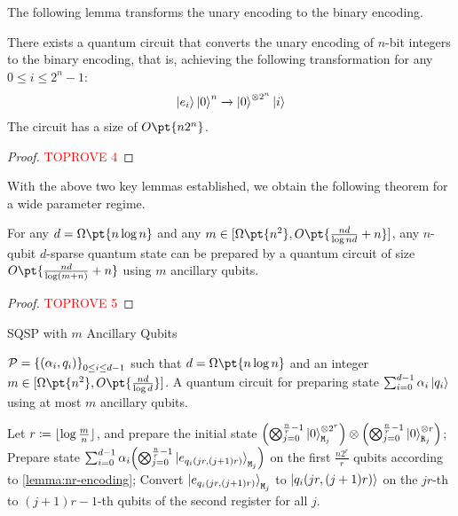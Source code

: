 \documentclass[a4paper,UKenglish,cleveref, autoref, thm-restate]{lipics-v2021}
\DeclarePairedDelimiter\rbra{\lparen}{\rparen}
\DeclarePairedDelimiter\sbra{\lbrack}{\rbrack}
\DeclarePairedDelimiter\cbra{\{}{\}}
\DeclarePairedDelimiter\floor{\lfloor}{\rfloor}
\newcommand{\bo}{O\pt}
\newcommand{\om}{\Omega\pt}
\begin{document}
The following lemma transforms the unary encoding to the binary encoding. 

\begin{lemma}\label{lemma:unary2binary}
    There exists a quantum circuit that converts the unary encoding of $n$-bit integers to the binary encoding, that is, achieving the following transformation for any $0 \leq i \leq 2^n-1$:
    \begin{align}
        \ket{e_i}\ket{0}^n \xrightarrow{} \ket{0}^{\otimes 2^n} \ket{i}
    \end{align}
    The circuit has a size of $\bo{n2^n}$.
\end{lemma}
\begin{proof}\textcolor{red}{TOPROVE 4}\end{proof}

With the above two key lemmas established, we obtain the following theorem for a wide parameter regime.

\begin{theorem}\label{thm:withanc}
   For any $d = \om{n\log n}$ and any $m \in \sbra{\om{n^2}, \bo{\frac{nd}{\log nd} + n}}$, any $n$-qubit $d$-sparse quantum state can be prepared by a quantum circuit of size $\bo{\frac{nd}{\log (m+n)} + n}$ using $m$ ancillary qubits.
\end{theorem}

\begin{proof}\textcolor{red}{TOPROVE 5}\end{proof}

\begin{algorithm}[htbp]
    \caption{SQSP with $m$ Ancillary Qubits}\label{alg:withanc} 
    \begin{algorithmic}[1]
    \REQUIRE $ \mathcal{P} = \cbra*{\rbra*{\alpha_i, q_i}}_{0\leq i \leq d-1}$ such that $d = \om{n\log n}$  and an integer $m \in \sbra{\om{n^2}, \bo{\frac{nd}{\log d}}}$.
    \ENSURE A quantum circuit for preparing state $\sum_{i=0}^{d-1} \alpha_i \ket{q_i}$ using at most $m$ ancillary qubits.
    
    \STATE Let $r \coloneqq \floor{\log \frac{m}{n}}$, and prepare the initial state $ \rbra*{\bigotimes_{j=0}^{\frac{n}{r}-1}\ket{0}^{\otimes 2^r}_{\texttt{M}_j}} \otimes \rbra*{\bigotimes_{j=0}^{\frac{n}{r}-1}\ket{0}^{\otimes r}_{\texttt{R}_j}}$;
    \STATE Prepare state $\sum_{i=0}^{d-1} \alpha_i \rbra*{\bigotimes_{j=0}^{\frac{n}{r}-1} \ket{e_{q_i(jr, (j+1)r)}}_{\texttt{M}_j}}$ on the first $\frac{n2^r}{r}$ qubits according to \cref{lemma:nr-encoding};
    \STATE Convert $\ket{e_{q_i(jr, (j+1)r)}}_{\texttt{M}_j}$ to $\ket{q_i(jr, (j+1)r)}$ on the $jr$-th to $(j+1)r - 1$-th qubits of the second register for all $j$.
    \end{algorithmic}
\end{algorithm}
\end{document}
